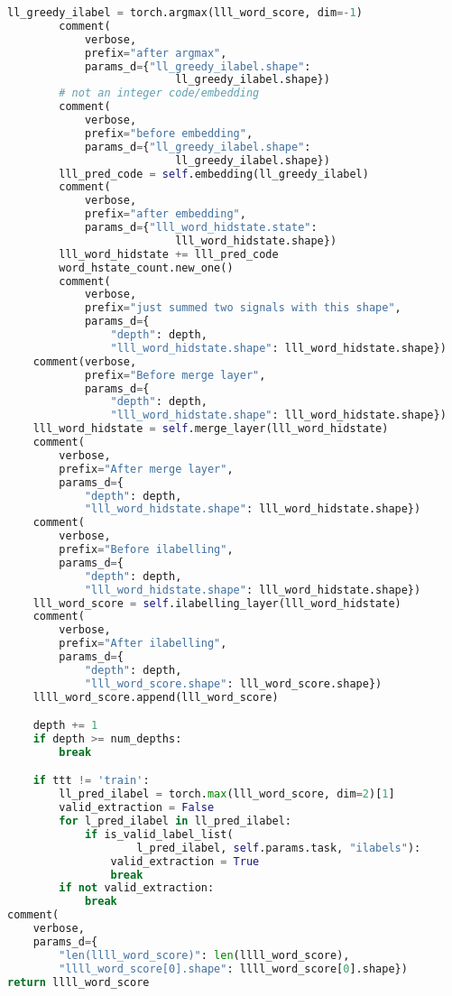 \documentclass[12pt]{article}
\begin{document}
\begin{lstlisting}[language=Python]
        ll_greedy_ilabel = torch.argmax(lll_word_score, dim=-1)
        comment(
            verbose,
            prefix="after argmax",
            params_d={"ll_greedy_ilabel.shape":
                          ll_greedy_ilabel.shape})
        # not an integer code/embedding
        comment(
            verbose,
            prefix="before embedding",
            params_d={"ll_greedy_ilabel.shape":
                          ll_greedy_ilabel.shape})
        lll_pred_code = self.embedding(ll_greedy_ilabel)
        comment(
            verbose,
            prefix="after embedding",
            params_d={"lll_word_hidstate.state":
                          lll_word_hidstate.shape})
        lll_word_hidstate += lll_pred_code
        word_hstate_count.new_one()
        comment(
            verbose,
            prefix="just summed two signals with this shape",
            params_d={
                "depth": depth,
                "lll_word_hidstate.shape": lll_word_hidstate.shape})
    comment(verbose,
            prefix="Before merge layer",
            params_d={
                "depth": depth,
                "lll_word_hidstate.shape": lll_word_hidstate.shape})
    lll_word_hidstate = self.merge_layer(lll_word_hidstate)
    comment(
        verbose,
        prefix="After merge layer",
        params_d={
            "depth": depth,
            "lll_word_hidstate.shape": lll_word_hidstate.shape})
    comment(
        verbose,
        prefix="Before ilabelling",
        params_d={
            "depth": depth,
            "lll_word_hidstate.shape": lll_word_hidstate.shape})
    lll_word_score = self.ilabelling_layer(lll_word_hidstate)
    comment(
        verbose,
        prefix="After ilabelling",
        params_d={
            "depth": depth,
            "lll_word_score.shape": lll_word_score.shape})
    llll_word_score.append(lll_word_score)

    depth += 1
    if depth >= num_depths:
        break

    if ttt != 'train':
        ll_pred_ilabel = torch.max(lll_word_score, dim=2)[1]
        valid_extraction = False
        for l_pred_ilabel in ll_pred_ilabel:
            if is_valid_label_list(
                    l_pred_ilabel, self.params.task, "ilabels"):
                valid_extraction = True
                break
        if not valid_extraction:
            break
comment(
    verbose,
    params_d={
        "len(llll_word_score)": len(llll_word_score),
        "llll_word_score[0].shape": llll_word_score[0].shape})
return llll_word_score
\end{lstlisting}
\end{document}
